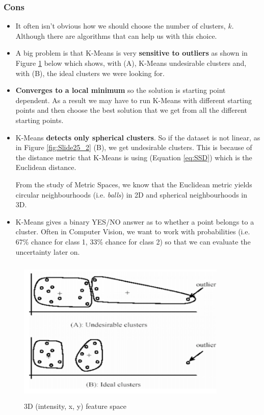 \documentclass{article}
\begin{document}
\subsubsection*{Cons}
\begin{itemize}

\item It often isn't obvious how we should choose the number of clusters, $k$. Although there are algorithms that can help us with this choice.

\item A big problem is that K-Means is very \textbf{sensitive to outliers} as shown in Figure \ref{fig:Slide25_1} below which shows, with (A), K-Means undesirable clusters and, with (B), the ideal clusters we were looking for.

\item \textbf{Converges to a local minimum} so the solution is starting point dependent. As a result we may have to run K-Means with different starting points and then choose the best solution that we get from all the different starting points.

\item K-Means \textbf{detects only spherical clusters}. So if the dataset is not linear, as in Figure \ref{fig:Slide25_2} (B), we get undesirable clusters. This is because of the distance metric that K-Means is using (Equation \ref{eq:SSD}) which is the Euclidean distance. 

From the study of Metric Spaces, we know that the Euclidean metric yields circular neighbourhoods (i.e. \textit{balls}) in 2D and spherical neighbourhoods in 3D.

\item K-Means gives a binary YES/NO answer as to whether a point belongs to a cluster. Often in Computer Vision, we want to work with probabilities (i.e. 67\% chance for class 1, 33\% chance for class 2) so that we can evaluate the uncertainty later on.
\end{itemize}

\begin{figure}[htp]
    \centering
    \includegraphics[width=10cm,height=7cm]{slide_25_1}
    \caption{3D (intensity, x, y) feature space}
    \label{fig:Slide25_1}
\end{figure}
\end{document}
